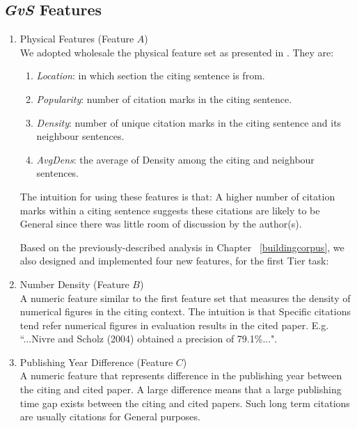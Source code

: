 \subsection*{{\it GvS} Features}
\begin{enumerate}
\item Physical Features (Feature $A$)\\
We adopted wholesale the physical feature set as presented in \cite{dongensemble}. They are:
\begin{enumerate}
\item \textit{Location}: in which section the citing sentence is from.
\item \textit{Popularity}: number of citation marks in the citing sentence.
\item \textit{Density}: number of unique citation marks in the citing sentence and its neighbour sentences.
\item \textit{AvgDens}: the average of Density among the citing and neighbour sentences.
\end{enumerate}

The intuition for using these features is that: A higher number of citation marks within a citing sentence suggests these citations are likely to be General since there was little room of discussion by the author(s).  

Based on the previously-described analysis in Chapter~ \ref{buildingcorpus}, we also designed and implemented four new features, for the first Tier task: 

\item Number Density (Feature $B$)\\
A numeric feature similar to the first feature set that measures the density of numerical figures in the citing context. The intuition is that Specific citations tend refer numerical figures in evaluation results in the cited paper. E.g. ``...Nivre and Scholz (2004) obtained a precision of 79.1\%...".

\item Publishing Year Difference (Feature $C$)\\
A numeric feature that represents difference in the publishing year between the citing and cited paper. A large difference means that a large publishing time gap exists between the citing and cited papers.  Such long term citations are usually citations for General purposes.


\end{enumerate}
